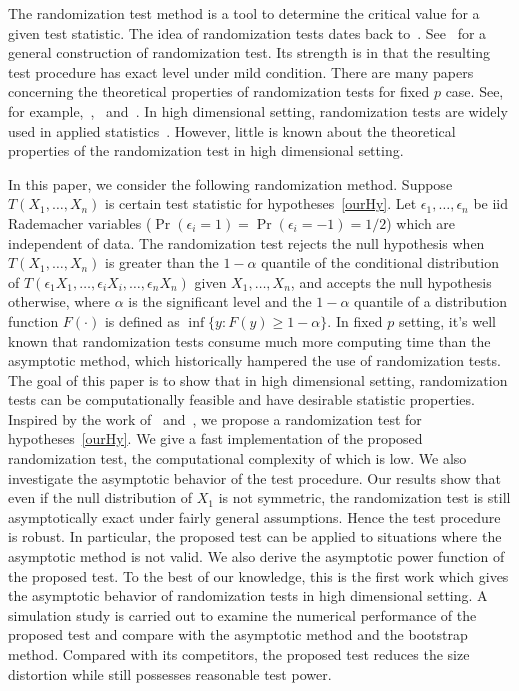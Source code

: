 \documentclass[3p]{elsarticle}
\theoremstyle{plain}
\theoremstyle{definition}
\theoremstyle{remark}
\begin{document}
The randomization test method is a tool to determine the critical value for a given test statistic.
The idea of randomization tests dates back to~\citet{Fisher}.
See~\citet{Romano1990On} for a general construction of randomization test.
Its strength is in that the resulting test procedure has exact level under mild condition.
There are many papers concerning the theoretical properties of randomization tests for fixed $p$ case.
See, for example,~\citet{Romano1990On},~\citet{Zhu2000N} and~\citet{Chung2016Multivariate}.
In high dimensional setting, randomization tests are widely used in applied statistics~\citep{Subramanian2005,efron2007on,Ko2016}.
However, little is known about the theoretical properties of the randomization test in high dimensional setting.

In this paper, we consider the following randomization method.
Suppose $T(X_1,\ldots,X_n)$ is certain test statistic for hypotheses~\eqref{ourHy}.
Let $\epsilon_1,\ldots,\epsilon_n$ be iid Rademacher variables ($\Pr(\epsilon_i=1)=\Pr(\epsilon_i=-1)=1/2$) which are independent of data.
 The randomization test rejects the null hypothesis when $T(X_1,\ldots, X_n)$ is greater than the $1-\alpha$ quantile of the conditional distribution of $T(\epsilon_1 X_1,\ldots,\epsilon_i X_i,\ldots,\epsilon_n X_n)$ given $X_1,\ldots,X_n$,
 and accepts the null hypothesis otherwise, where $\alpha$ is the significant level and the $1-\alpha$ quantile of a distribution function $F(\cdot)$ is defined as $\inf\{y: F(y)\geq 1-\alpha\}$.
In fixed $p$ setting, it's well known that randomization tests consume much more computing time than the asymptotic method, which  historically  hampered the use of randomization tests. 
The goal of this paper is to show that in high dimensional setting, randomization tests can be computationally feasible and have desirable statistic properties.
Inspired by the work of~\citet{Bai1996Efiect} and~\citet{Chen2010A}, we propose a randomization test for hypotheses~\eqref{ourHy}.
We give a fast implementation of the proposed randomization test, the computational complexity of which is low.
We also investigate the asymptotic behavior of the test procedure.
Our results show that even if the null distribution of $X_1$ is not symmetric, the randomization test is still asymptotically exact under fairly general assumptions. 
Hence the test procedure is robust.
In particular, the proposed test can be applied to situations where the asymptotic method is not valid.
We also derive the asymptotic power function of the proposed test.
To the best of our knowledge, this is the first work which gives the asymptotic behavior of randomization tests in high dimensional setting.
A simulation study is carried out to examine the numerical performance of the proposed test and compare with the asymptotic method and the bootstrap method.
Compared with its competitors, the proposed test reduces the size distortion while still possesses reasonable test power.
\end{document}
